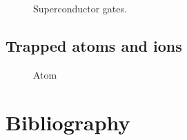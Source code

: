 \documentclass{ctexbook}
\begin{document}
\begin{figure}[h]

\caption{Superconductor gates.}
\label{superGates}
\end{figure}

\section{Trapped atoms and ions}

\begin{figure}[h]

\caption{Atom}
\label{Atom}
\end{figure}


\chapter*{Bibliography}

   

\printindex
\end{document}
